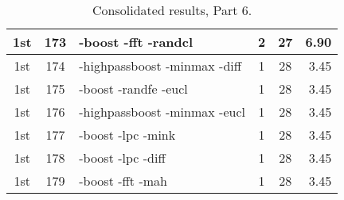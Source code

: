 \begin{table}
\begin{minipage}[b]{\textwidth}
\begin{tabular}{|c|c|l|c|c|r|}
1st & 173 & -boost -fft -randcl  & 2 & 27 & 6.90\\ \hline
1st & 174 & -highpassboost -minmax -diff  & 1 & 28 & 3.45\\ \hline
1st & 175 & -boost -randfe -eucl  & 1 & 28 & 3.45\\ \hline
1st & 176 & -highpassboost -minmax -eucl  & 1 & 28 & 3.45\\ \hline
1st & 177 & -boost -lpc -mink  & 1 & 28 & 3.45\\ \hline
1st & 178 & -boost -lpc -diff  & 1 & 28 & 3.45\\ \hline
1st & 179 & -boost -fft -mah  & 1 & 28 & 3.45\\ \hline
\end{tabular}
\end{minipage}
\caption{Consolidated results, Part 6.}
\label{tab:results6}
\end{table}

